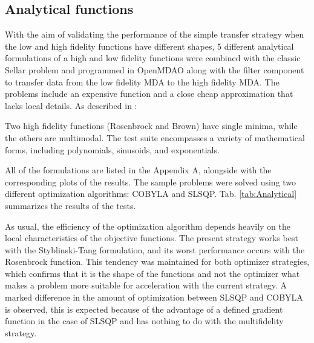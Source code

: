 \documentclass[conf]{new-aiaa}
\begin{document}
\subsection{Analytical functions}
With the aim of validating the performance of the simple transfer strategy when the low and high fidelity functions have different shapes, 5 different analytical formulations of a high and low fidelity functions \cite{Bryson2018} were combined with the classic Sellar problem \cite{Sellar1996} and programmed in OpenMDAO along with the filter component to transfer data from the low fidelity MDA to the high fidelity MDA. The problems include an expensive function and a close cheap approximation that lacks local details. As described in \cite{Bryson2018}:
\begin{quoting}
Two high fidelity functions (Rosenbrock and Brown) have single minima, while the others are multimodal. The test suite encompasses a variety of mathematical forms, including polynomials, sinusoids, and exponentials.
\end{quoting} All of the formulations are listed in the Appendix A, alongside with the corresponding plots of the results. The sample problems were solved using two different optimization algorithms: COBYLA and SLSQP. Tab. \ref{tab:Analytical} summarizes the results of the tests. 
\par As usual, the efficiency of the optimization algorithm depends heavily on the local characteristics of the objective functions. The present strategy works best with the Styblinski-Tang formulation, and its worst performance occurs with the Rosenbrock function. This tendency was maintained for both optimizer strategies, which confirms that it is the shape of the functions and not the optimizer what makes a problem more suitable for acceleration with the current strategy. A marked difference in the amount of optimization between SLSQP and COBYLA is observed, this is expected because of the advantage of a defined gradient function in the case of SLSQP and has nothing to do with the multifidelity strategy.
\end{document}
